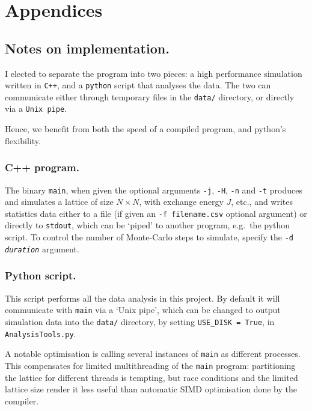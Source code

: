 \documentclass[12pt]{article}
\begin{document}
\section{Appendices}\label{sec:appendices}

\subsection{Notes on implementation.}\label{sec:implementation}

I elected to separate the program into two pieces: a high performance simulation written in \texttt{C++}, and a \texttt{python} script that analyses the data. The two can communicate either through temporary files in the \texttt{data/} directory, or directly via a \texttt{Unix pipe}.

Hence, we benefit from both the speed of a compiled program, and python's flexibility. 

\subsubsection{C++ program.}

The binary \texttt{main}, when given the optional arguments \texttt{-j}, \texttt{-H}, \texttt{-n} and \texttt{-t} produces and simulates a lattice of size \(N \times N\), with exchange energy \(J\), etc., and writes statistics data either to a file (if given an \texttt{-f filename.csv} optional argument) or directly to \texttt{stdout}, which can be `piped' to another program, e.g.~the python script. To control the number of Monte-Carlo steps to simulate, specify the \texttt{-d \textit{duration}} argument.

\subsubsection{Python script.}

This script performs all the data analysis in this project. By default it will communicate with \texttt{main} via a `Unix pipe', which can be changed to output simulation data into the \texttt{data/} directory, by setting \texttt{USE\_DISK = True}, in \texttt{AnalysisTools.py}.

A notable optimisation is calling several instances of \texttt{main} as different processes. This compensates for limited multithreading of the \texttt{main} program: partitioning the lattice for different threads is tempting, but race conditions and the limited lattice size render it less useful than automatic SIMD optimisation done by the compiler. 
\end{document}

